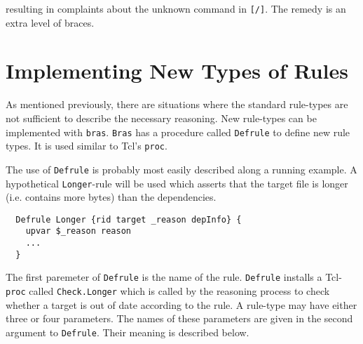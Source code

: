 \documentclass[12pt]{article}
\newcommand{\bras}{\texttt{bras}}
\newcommand{\Bras}{\texttt{Bras}}
\begin{document}
resulting in complaints about the unknown command in
\texttt{[/]}. The remedy is an extra level of braces.


\section{Implementing New Types of Rules}
\label{secNewRules}
As mentioned previously, there are situations where the standard
rule-types are not sufficient to describe the necessary reasoning.
New rule-types can be implemented
with \bras{}. \Bras{} has a procedure called \texttt{Defrule} to
define new rule types. It is used similar to Tcl's \texttt{proc}.

The use of \texttt{Defrule} is probably most easily described along a
running example. A hypothetical \texttt{Longer}-rule will be used
which asserts that the target file is longer (i.e. contains more
bytes) than the dependencies.

\begin{verbatim}
  Defrule Longer {rid target _reason depInfo} {
    upvar $_reason reason
    ...
  }
\end{verbatim}

The first paremeter of \texttt{Defrule} is the name of the rule.
\texttt{Defrule} installs a Tcl-\texttt{proc} called
\texttt{Check.Longer} which is called by the reasoning process to
check whether a target is out of date according to the rule. A
rule-type may have either three or four parameters. The names of these
parameters are given in the second argument to \texttt{Defrule}. Their
meaning is described below.
\end{document}
